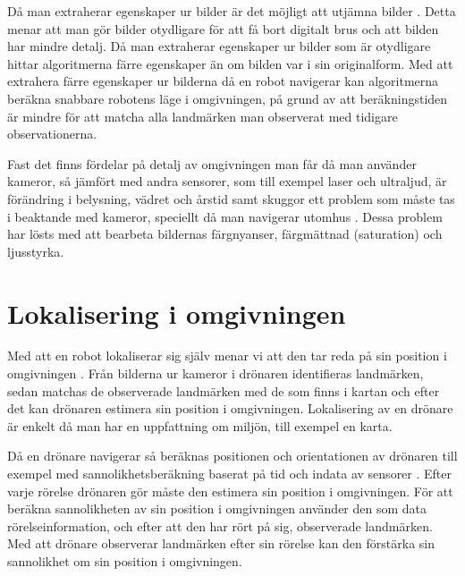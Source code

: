 Då man extraherar egenskaper ur bilder är det möjligt att utjämna bilder \citep{mapbuildingsift}. Detta menar att man gör bilder otydligare för att få bort digitalt brus och att bilden har mindre detalj. Då man extraherar egenskaper ur bilder som är otydligare hittar algoritmerna färre egenskaper än om bilden var i sin originalform. Med att extrahera färre egenskaper ur bilderna då en robot navigerar kan algoritmerna beräkna snabbare robotens läge i omgivningen, på grund av att beräkningstiden är mindre för att matcha alla landmärken man observerat med tidigare observationerna.

Fast det finns fördelar på detalj av omgivningen man får då man använder kameror, så jämfört med andra sensorer, som till exempel laser och ultraljud, är förändring i belysning, vädret och årstid samt skuggor ett problem som måste tas i beaktande med kameror, speciellt då man navigerar utomhus \citep{982903}. Dessa problem har lösts med att bearbeta bildernas färgnyanser, färgmättnad (saturation) och ljusstyrka.

\section{Lokalisering i omgivningen}

Med att en robot lokaliserar sig själv menar vi att den tar reda på sin position i omgivningen \citep{982903}. Från bilderna ur kameror i drönaren identifieras landmärken, sedan matchas de observerade landmärken med de som finns i kartan och efter det kan drönaren estimera sin position i omgivningen. Lokalisering av en drönare är enkelt då man har en uppfattning om miljön, till exempel en karta.

Då en drönare navigerar så beräknas positionen och orientationen av drönaren till exempel med sannolikhetsberäkning baserat på tid och indata av sensorer \citep{ProbabilisticRobotics}. Efter varje rörelse drönaren gör måste den estimera sin position i omgivningen. För att beräkna sannolikheten av sin position i omgivningen använder den som data rörelseinformation, och efter att den har rört på sig, observerade landmärken. Med att drönare observerar landmärken efter sin rörelse kan den förstärka sin sannolikhet om sin position i omgivningen. 

